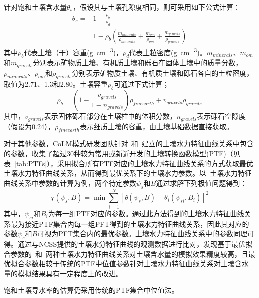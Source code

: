 针对饱和土壤含水量$\theta_s$，假设其与土壤孔隙度相同，则可采用如下公式计算：
\begin{equation}
    \begin{aligned}
        \theta_s =& 1-\frac{\rho_b}{\rho_d}\\
        =& 1-\rho_b\left(\frac{m_{minerals}}{\rho_{minerals}}+\frac{m_{om}}{\rho_{om}}+\frac{m_{gravels}}{\rho_{gravels}}\right)
    \end{aligned}
\end{equation}
其中$\rho_b$代表土壤（干）容重(\unit{g.cm^{-3}})，$\rho_d$代表土粒密度(\unit{g.cm^{-3}})。$m_{minerals}$、$m_{om}$和$m_{gravels}$分别表示矿物质土壤、有机质土壤和砾石在固体土壤中的质量分数，$\rho_{minerals}$、$\rho_{om}$和$\rho_{gravels}$分别表示矿物质土壤、有机质土壤和砾石各自的土粒密度，取值为2.71、1.3和2.80。土壤容重$\rho_b$可通过下式计算；$$\rho_b=\left(1-\frac{v_{gravels}}{1-n_{gravels}}\right)\rho_{fineearth}+v_{gravels}\rho_{gravels}$$
其中，$v_{gravels}$表示固体砾石部分在土壤柱中的体积分数，$n_{gravels}$表示砾石空隙度（假设为0.24），$\rho_{fineearth}$表示细质土壤的容重，由土壤基础数据直接获取。

对于其他参数，CoLM模式研发团队针对~\citet{campbell1974}和~\citet{van1980closed}建立的土壤水力特征曲线关系中包含的参数，收集了超过30种较为常用或新近开发的土壤转换函数模型(PTF)（见表~\ref{tab:PTFs}），采用拟合所有PTF对应的土壤水力特征曲线关系的方式获取最优土壤水力特征曲线关系，从而得到最优关系下的土壤水力参数。以~\citet{campbell1974}土壤水力特征曲线关系中参数的计算为例，两个待定参数$\psi_s$和$B$通过求解下列极值问题得到：$$\chi\left(\psi_s,B\right)=\min\sum_{i=1}^N\left[\theta\left(\psi_s,B\right)-\theta_i\left(\psi_{si},B_{i}\right)\right]^2$$
其中，$\psi_{si}$和$B_{i}$为每一组PTF对应的参数。通过此方法得到的土壤水力特征曲线关系最为接近PTF集合内每一组PFT得到的土壤水力特征曲线关系，因此其对应的参数$\psi_{s}$和$B$可视为PFT集合内的最优参数。\citet{van1980closed}土壤水力特征曲线关系中的参数同理可得。\citet{dai2019parameters}通过与NCSS提供的土壤水分特征曲线的观测数据进行比对，发现基于最优拟合参数的~\citet{campbell1974}和~\citet{van1980closed}两种土壤水力特征曲线关系对土壤含水量的模拟效果精度较高，且最优拟合参数相较于传统的PTF中位值参数针对土壤水力特征曲线关系对土壤含水量的模拟结果具有一定程度上的改进。

饱和土壤导水率的估算仍采用传统的PTF集合中位值法。

